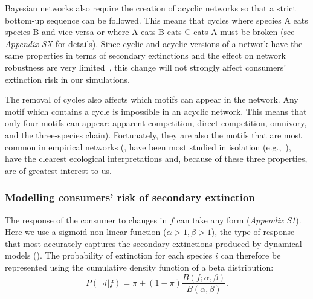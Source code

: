 \documentclass[12pt]{article}
\begin{document}
\begin{spacing}{2.0}
        
        Bayesian networks also require the creation of acyclic networks so that a strict bottom-up sequence can be followed. 
        This means that cycles where species A eats species B and vice versa or where A eats B eats C eats A must be broken (see \emph{Appendix SX} for details).
        Since cyclic and acyclic versions of a network have the same properties in terms of secondary extinctions and the effect on network robustness are very limited~\citep{Allesina2009functional}, this change will not strongly affect consumers' extinction risk in our simulations.

        
        The removal of cycles also affects which motifs can appear in the network. 
        Any motif which contains a cycle is impossible in an acyclic network.
        This means that only four motifs can appear: apparent competition, direct competition, omnivory, and the three-species chain).
        Fortunately, they are also the motifs that are most common in empirical networks (\citealp[]{Stouffer2007}, have been most studied in isolation (e.g.,~\citep{Hastings1991,Holt1987,Bascompte2005,Polis1989,Zabalo2012,Lefevre2009,Holt1997,Kondoh2008,McKinnon2013,Laws2013}), have the clearest ecological interpretations and, because of these three properties, are of greatest interest to us.


        \subsubsection*{Modelling consumers' risk of secondary extinction}
        
        The response of the consumer to changes in $f$ can take any form (\emph{Appendix S1}). Here we use a sigmoid non-linear function ($\alpha > 1, \beta > 1$), the type of response that most accurately captures the secondary extinctions produced by dynamical models (\citealp[]{Eklof2013}).
		The probability of extinction for each species $i$ can therefore be represented using the cumulative density function of a beta distribution:
		\begin{equation}
		P(\lnot i|f) = \pi + (1 - \pi) \frac{B(f;\alpha,\beta)}{B(\alpha,\beta)}.
				\label{betafunc}
        \end{equation}
		

\end{spacing}
\end{document}
